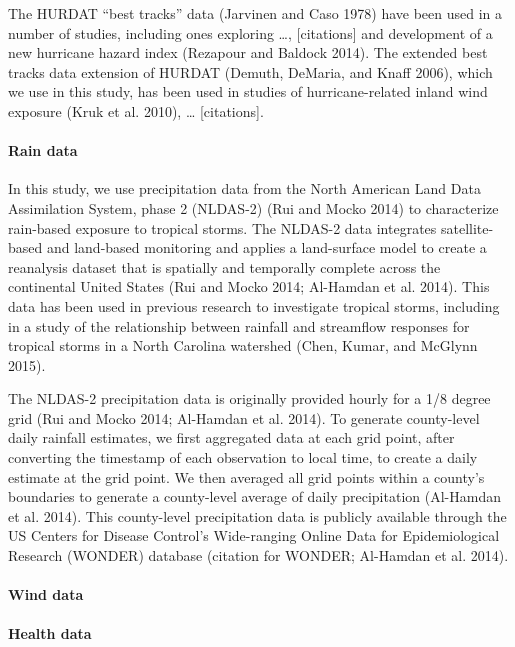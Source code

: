 \documentclass[]{elsarticle} %
\begin{document}
The HURDAT ``best tracks'' data (Jarvinen and Caso 1978) have been used
in a number of studies, including ones exploring \ldots{},
{[}citations{]} and development of a new hurricane hazard index
(Rezapour and Baldock 2014). The extended best tracks data extension of
HURDAT (Demuth, DeMaria, and Knaff 2006), which we use in this study,
has been used in studies of hurricane-related inland wind exposure (Kruk
et al. 2010), \ldots{} {[}citations{]}.

\paragraph{Rain data}\label{rain-data}

In this study, we use precipitation data from the North American Land
Data Assimilation System, phase 2 (NLDAS-2) (Rui and Mocko 2014) to
characterize rain-based exposure to tropical storms. The NLDAS-2 data
integrates satellite-based and land-based monitoring and applies a
land-surface model to create a reanalysis dataset that is spatially and
temporally complete across the continental United States (Rui and Mocko
2014; Al-Hamdan et al. 2014). This data has been used in previous
research to investigate tropical storms, including in a study of the
relationship between rainfall and streamflow responses for tropical
storms in a North Carolina watershed (Chen, Kumar, and McGlynn 2015).

The NLDAS-2 precipitation data is originally provided hourly for a 1/8
degree grid (Rui and Mocko 2014; Al-Hamdan et al. 2014). To generate
county-level daily rainfall estimates, we first aggregated data at each
grid point, after converting the timestamp of each observation to local
time, to create a daily estimate at the grid point. We then averaged all
grid points within a county's boundaries to generate a county-level
average of daily precipitation (Al-Hamdan et al. 2014). This
county-level precipitation data is publicly available through the US
Centers for Disease Control's Wide-ranging Online Data for
Epidemiological Research (WONDER) database (citation for WONDER;
Al-Hamdan et al. 2014).

\paragraph{Wind data}\label{wind-data}

\paragraph{Health data}\label{health-data}
\end{document}
